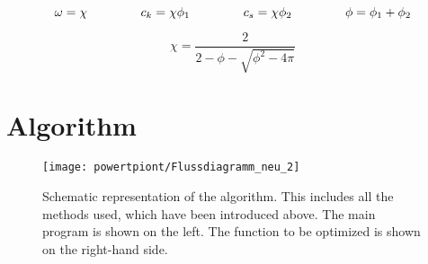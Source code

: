  \begin{equation}
	\omega = \chi \hspace{1.5cm} c_k = \chi \phi_1 \hspace{1.5cm} c_s = \chi \phi_2 \hspace{1.5cm} \phi = \phi_1 + \phi_2
	\label{eq:c_parameter}
\end{equation}

 \begin{equation}
	\chi = \dfrac{2}{2-\phi-\sqrt{\phi^2-4\pi}}
	\label{eq:chi_parameter}
\end{equation}



\section{Algorithm}
\label{sec:algorithm}





\begin{figure}[!htb]
    \centering
    \texttt{[image: powertpiont/Flussdiagramm\_neu\_2]} %
    \caption[Scheme of the algorithm]{Schematic representation of the algorithm. This includes all the methods used, which have been introduced above. The main program is shown on the left. The function to be optimized is shown on the right-hand side.}
    \label{fig:flowchart}
\end{figure}




 


